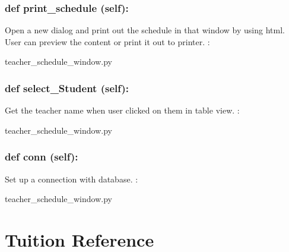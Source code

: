 \hypertarget{class_poly_a14a7ad77ce612b0c54f531d307ee4b39}{
\subsubsection[{def print_schedule (self):}]{\setlength{\rightskip}{0pt plus 5cm}def {print\_schedule} (self):}}\label{class_poly_a14a7ad77ce612b0c54f531d307ee4b39}
Open a new dialog and print out the schedule in that window by using html. User can preview the content or print it out to printer.
:\begin{DoxyCompactItemize}
\item 
teacher\_schedule\_window.\-py\end{DoxyCompactItemize}

\hypertarget{class_poly_a14a7ad77ce612b0c54f531d307ee4b39}{
\subsubsection[{def select_Student (self):}]{\setlength{\rightskip}{0pt plus 5cm}def {select\_Student} (self):}}\label{class_poly_a14a7ad77ce612b0c54f531d307ee4b39}
Get the teacher name when user clicked on them in table view.
:\begin{DoxyCompactItemize}
\item 
teacher\_schedule\_window.\-py\end{DoxyCompactItemize}

\hypertarget{class_poly_a14a7ad77ce612b0c54f531d307ee4b39}{
\subsubsection[{def conn (self):}]{\setlength{\rightskip}{0pt plus 5cm}def {conn} (self):}}\label{class_poly_a14a7ad77ce612b0c54f531d307ee4b39}
Set up a connection with database.
:\begin{DoxyCompactItemize}
\item 
teacher\_schedule\_window.\-py\end{DoxyCompactItemize}

\hypertarget{Tuition}{\section{Tuition Reference}
\label{Tuition}
}
